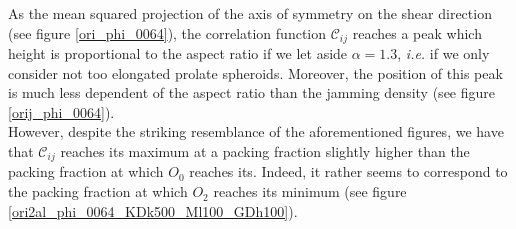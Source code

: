 \documentclass[class=report, float=false, crop=false]{standalone}
\begin{document}
As the mean squared projection of the axis of symmetry on the shear direction (see figure \ref{ori_phi_0064}), the correlation function $\mathcal{C}_{ij}$ reaches a peak which height is proportional to the aspect ratio if we let aside $\alpha=1.3$, \textit{i.e.} if we only consider not too elongated prolate spheroids. Moreover, the position of this peak is much less dependent of the aspect ratio than the jamming density (see figure \ref{orij_phi_0064}).\\

However, despite the striking resemblance of the aforementioned figures, we have that $\mathcal{C}_{ij}$ reaches its maximum at a packing fraction slightly higher than the packing fraction at which $O_0$ reaches its. Indeed, it rather seems to correspond to the packing fraction at which $O_2$ reaches its minimum (see figure \ref{ori2al_phi_0064_KDk500_Ml100_GDh100}).

\end{document}
